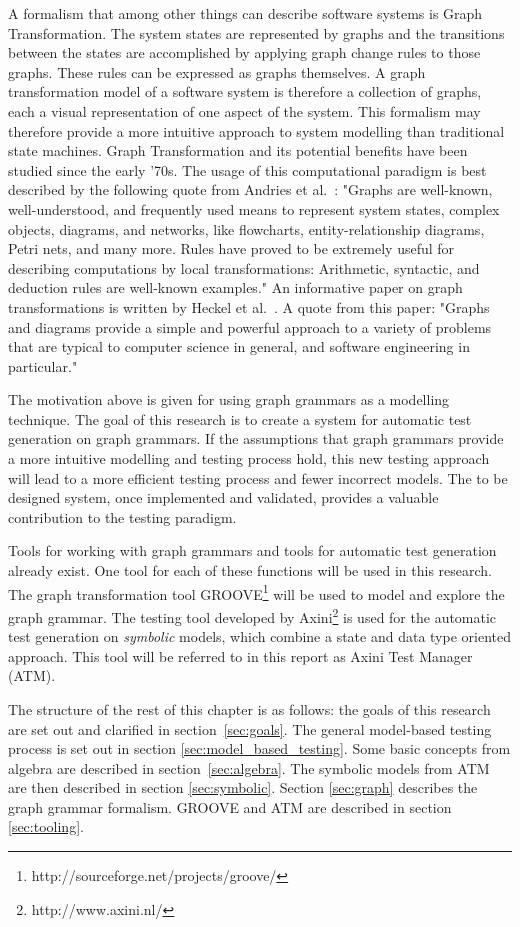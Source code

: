 A formalism that among other things can describe software systems is Graph Transformation. The system states are represented by graphs and the transitions between the states are accomplished by applying graph change rules to those graphs. These rules can be expressed as graphs themselves. A graph transformation model of a software system is therefore a collection of graphs, each a visual representation of one aspect of the system. This formalism may therefore provide a more intuitive approach to system modelling than traditional state machines. Graph Transformation and its potential benefits have been studied since the early '70s. The usage of this computational paradigm is best described by the following quote from Andries et al.~\cite{Andries1999}: "Graphs are well-known, well-understood, and frequently used means to represent system states, complex objects, diagrams, and networks, like flowcharts, entity-relationship diagrams, Petri nets, and many more. Rules have proved to be extremely useful for describing computations by local transformations: Arithmetic, syntactic, and deduction rules are well-known examples." An informative paper on graph transformations is written by Heckel et al.~\cite{Heckel2006187}. A quote from this paper: "Graphs and diagrams provide a simple and powerful approach to a variety of problems that are typical to computer science in general, and software engineering in particular."

The motivation above is given for using graph grammars as a modelling technique. The goal of this research is to create a system for automatic test generation on graph grammars. If the assumptions that graph grammars provide a more intuitive modelling and testing process hold, this new testing approach will lead to a more efficient testing process and fewer incorrect models. The to be designed system, once implemented and validated, provides a valuable contribution to the testing paradigm.

Tools for working with graph grammars and tools for automatic test generation already exist. One tool for each of these functions will be used in this research. The graph transformation tool GROOVE\footnote{http://sourceforge.net/projects/groove/} will be used to model and explore the graph grammar. The testing tool developed by Axini\footnote{http://www.axini.nl/} is used for the automatic test generation on \textit{symbolic} models, which combine a state and data type oriented approach. This tool will be referred to in this report as Axini Test Manager (ATM).

The structure of the rest of this chapter is as follows: the goals of this research are set out and clarified in section~\ref{sec:goals}. The general model-based testing process is set out in section \ref{sec:model_based_testing}. Some basic concepts from algebra are described in section~\ref{sec:algebra}. The symbolic models from ATM are then described in section \ref{sec:symbolic}. Section \ref{sec:graph} describes the graph grammar formalism. GROOVE and ATM are described in section \ref{sec:tooling}.
